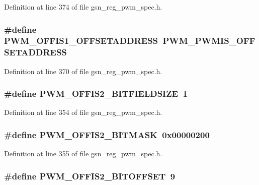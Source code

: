 Definition at line 374 of file gsn\_\-reg\_\-pwm\_\-spec.h.

\hypertarget{a00565_abc1a93ef7b96e1697a76326f1847b0e4}{
\subsubsection[{PWM\_\-OFFIS1\_\-OFFSETADDRESS}]{\setlength{\rightskip}{0pt plus 5cm}\#define PWM\_\-OFFIS1\_\-OFFSETADDRESS~PWM\_\-PWMIS\_\-OFFSETADDRESS}}
\label{a00565_abc1a93ef7b96e1697a76326f1847b0e4}


Definition at line 370 of file gsn\_\-reg\_\-pwm\_\-spec.h.

\hypertarget{a00565_a602ec25550a607b94e516304074a697c}{
\subsubsection[{PWM\_\-OFFIS2\_\-BITFIELDSIZE}]{\setlength{\rightskip}{0pt plus 5cm}\#define PWM\_\-OFFIS2\_\-BITFIELDSIZE~1}}
\label{a00565_a602ec25550a607b94e516304074a697c}


Definition at line 354 of file gsn\_\-reg\_\-pwm\_\-spec.h.

\hypertarget{a00565_ab7c352d8d1e26c09c7c7f3fbf68c6e97}{
\subsubsection[{PWM\_\-OFFIS2\_\-BITMASK}]{\setlength{\rightskip}{0pt plus 5cm}\#define PWM\_\-OFFIS2\_\-BITMASK~0x00000200}}
\label{a00565_ab7c352d8d1e26c09c7c7f3fbf68c6e97}


Definition at line 355 of file gsn\_\-reg\_\-pwm\_\-spec.h.

\hypertarget{a00565_aae57b43d574c920a6c5058652be7ccc2}{
\subsubsection[{PWM\_\-OFFIS2\_\-BITOFFSET}]{\setlength{\rightskip}{0pt plus 5cm}\#define PWM\_\-OFFIS2\_\-BITOFFSET~9}}
\label{a00565_aae57b43d574c920a6c5058652be7ccc2}


